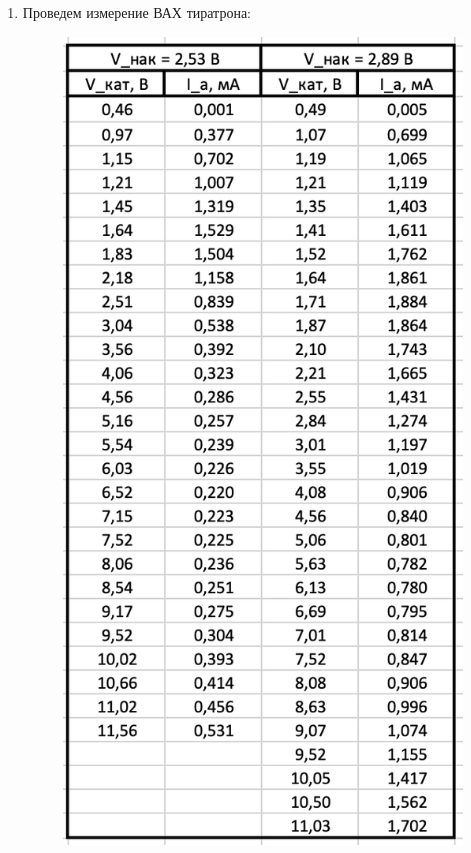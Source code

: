 \documentclass[a4paper, 12pt]{article}%
\begin{document}
\begin{enumerate}

\item Проведем измерение ВАХ тиратрона:

	\begin{figure}[h!]
		\centering
		\includegraphics[scale=0.52]{Таблица_3.PNG}
	\end{figure}	


\end{enumerate}
\end{document}
